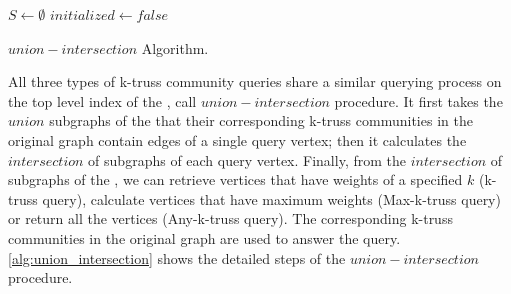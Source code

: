 \begin{algorithm}
	\BlankLine
	$S \gets \emptyset$\;
	$initialized \gets false$\;
	\BlankLine
	\BlankLine
	\caption{$union-intersection$ Algorithm.}\label{alg:union_intersection}
\end{algorithm}

All three types of \toplevelprob{} k-truss community queries share a similar querying process on the top level index of the \twolevelindex{}, call $union-intersection$ procedure. It first takes the $union$ subgraphs of the \treeindex{} that their corresponding k-truss communities in the original graph contain edges of a single query vertex; then it calculates the $intersection$ of subgraphs of each query vertex. Finally, from the $intersection$ of subgraphs of the \treeindex{}, we can retrieve vertices that have weights of a specified $k$ (k-truss query), calculate vertices that have maximum weights (Max-k-truss query) or return all the vertices (Any-k-truss query). The corresponding k-truss communities in the original graph are used to answer the query. \autoref{alg:union_intersection} shows the detailed steps of the $union-intersection$ procedure.

%


